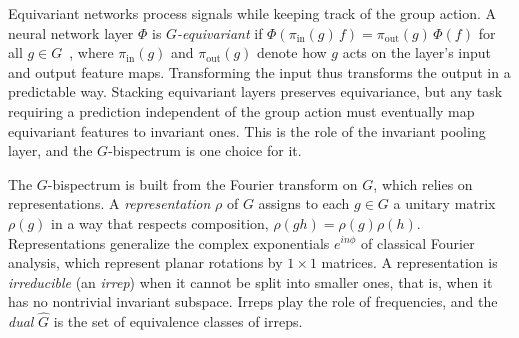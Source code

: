 \documentclass{article}
\theoremstyle{definition}
\theoremstyle{remark}
\theoremstyle{definition}
\begin{document}
Equivariant networks process signals while keeping track of the group action.
A neural network layer $\Phi$ is \emph{$G$-equivariant} if
$\Phi(\pi_{\mathrm{in}}(g)\, f) = \pi_{\mathrm{out}}(g)\, \Phi(f)$
for all $g \in G$~\citep{cohen2016group, weiler2019general}, where $\pi_{\mathrm{in}}(g)$ and
$\pi_{\mathrm{out}}(g)$ denote how $g$ acts on the layer's input and output feature maps.
Transforming the input thus transforms the output in a predictable way.
Stacking equivariant layers preserves equivariance, but any task requiring
a prediction independent of the group action must eventually map equivariant
features to invariant ones. This is the role of the invariant pooling layer, and the
$G$-bispectrum is one choice for it.

The $G$-bispectrum is built from the Fourier transform on $G$, which relies on representations.
A \emph{representation} $\rho$ of $G$ assigns to each $g\in G$ a unitary matrix $\rho(g)$ in a
way that respects composition, $\rho(gh)=\rho(g)\rho(h)$. Representations generalize the
complex exponentials $e^{in\phi}$ of classical Fourier analysis, which represent planar
rotations by $1\times1$ matrices. A representation is \emph{irreducible} (an \emph{irrep}) when
it cannot be split into smaller ones, that is, when it has no nontrivial invariant subspace.
Irreps play the role of frequencies, and the \emph{dual} $\hat{G}$ is the set of equivalence
classes of irreps.
\end{document}
